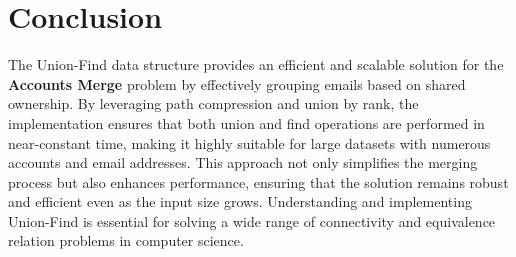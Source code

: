 \section*{Conclusion}

The Union-Find data structure provides an efficient and scalable solution for the \textbf{Accounts Merge} problem by effectively grouping emails based on shared ownership. By leveraging path compression and union by rank, the implementation ensures that both union and find operations are performed in near-constant time, making it highly suitable for large datasets with numerous accounts and email addresses. This approach not only simplifies the merging process but also enhances performance, ensuring that the solution remains robust and efficient even as the input size grows. Understanding and implementing Union-Find is essential for solving a wide range of connectivity and equivalence relation problems in computer science.

\printindex

% 
% 
% 
% 